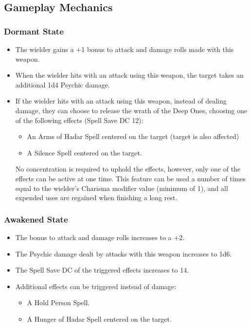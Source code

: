\subsection*{Gameplay Mechanics}
{\entryfont
\subsubsection*{Dormant State}
\begin{itemize}
	\item The wielder gains a +1 bonus to attack and damage rolls made with this weapon.
	\item When the wielder hits with an attack using this weapon, the target takes an additional 1d4 Psychic damage.
	\item If the wielder hits with an attack using this weapon, instead of dealing damage, they can choose to release the wrath of the Deep Ones, choosing one of the following effects (Spell Save DC 12):
	\begin{itemize}
		\item An Arms of Hadar Spell centered on the target (target is also affected)
		\item A Silence Spell centered on the target.
	\end{itemize}
	No concentration is required to uphold the effects, however, only one of the effects can be active at one time. This feature can be used a number of times equal to the wielder's Charisma modifier value (minimum of 1), and all expended uses are regained when finishing a long rest.
\end{itemize}
\subsubsection*{Awakened State}
\begin{itemize}
	\item The bonus to attack and damage rolls increases to a +2.
	\item The Psychic damage dealt by attacks with this weapon increases to 1d6.
	\item The Spell Save DC of the triggered effects increases to 14.
	\item Additional effects can be triggered instead of damage:
	\begin{itemize}
		\item A Hold Person Spell.
		\item A Hunger of Hadar Spell centered on the target.
	\end{itemize}
\end{itemize}
}

